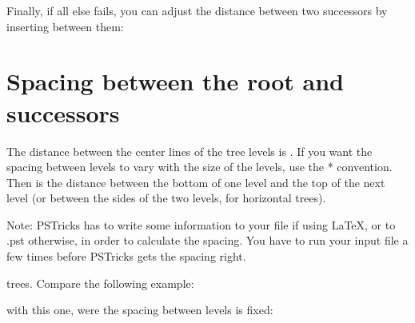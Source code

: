 \documentclass[fontsize=11pt,english,BCOR=10mm,DIV=12,bibliography=totoc,parskip=false,
   headings=small, headinclude=false,footinclude=false,oneside]{pst-doc}
\begin{document}
Finally, if all else fails, you can adjust the distance between two successors 
by inserting  between them:

\begin{LTXexample}[pos=l,width=0.4\linewidth]
\end{LTXexample}

\section{Spacing between the root and successors}

The distance between the center lines of the tree levels is .
If you want the spacing between levels to vary with the size of the levels,
use the * convention. Then  is the distance between the bottom of
one level and the top of the next level (or between the sides of the two
levels, for horizontal trees).

Note: PSTricks has to write some information to your  file if using
\LaTeX, or to .pst otherwise, in order to calculate the spacing.
You have to run your input file a few times before PSTricks gets the spacing
right.



trees. Compare the following example:

\begin{LTXexample}
  \def\psedge#1#2{\ncdiagg[nodesep=3pt,angleA=180,armA=0]{#2}{#1}}
\end{LTXexample}

with this one, were the spacing between levels is fixed:

\begin{LTXexample}
  \def\psedge#1#2{\ncdiagg[nodesep=3pt,angleA=180,armA=0]{#2}{#1}}
\end{LTXexample}

\end{document}
